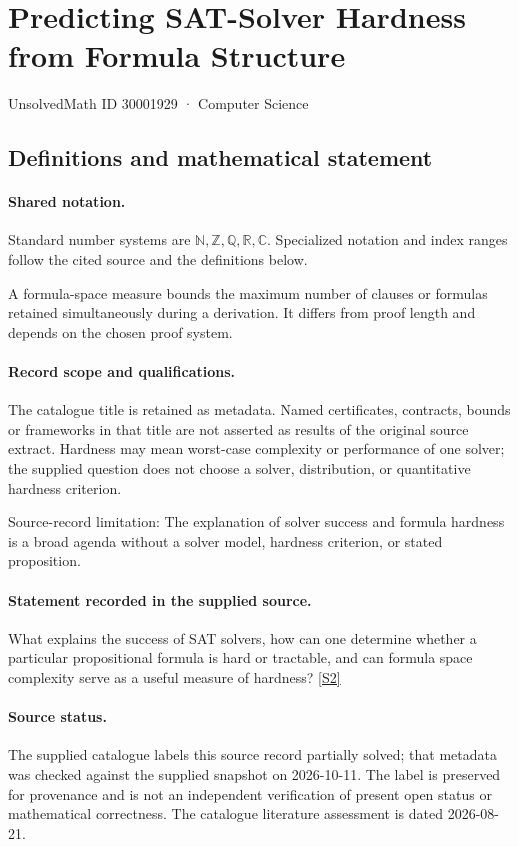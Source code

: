 \documentclass[11pt]{article}
\newcommand{\sref}[2]{\hyperlink{source:#1:#2}{[S#2]}}
\begin{document}
\setcounter{section}{30001928}
\section{Predicting SAT-Solver Hardness from Formula Structure}\label{30001929}
{\small\sffamily UnsolvedMath ID 30001929 · Computer Science}
\subsection{Definitions and mathematical statement}

\paragraph{Shared notation.}Standard number systems are $\mathbb N,\mathbb Z,\mathbb Q,\mathbb R,\mathbb C$. Specialized notation and index ranges follow the cited source and the definitions below.


A formula-space measure bounds the maximum number of clauses or formulas retained simultaneously during a derivation. It differs from proof length and depends on the chosen proof system.
\paragraph{Record scope and qualifications.}
The catalogue title is retained as metadata. Named certificates, contracts, bounds or frameworks in that title are not asserted as results of the original source extract.
Hardness may mean worst-case complexity or performance of one solver; the supplied question does not choose a solver, distribution, or quantitative hardness criterion.

Source-record limitation: The explanation of solver success and formula hardness is a broad agenda without a solver model, hardness criterion, or stated proposition.
\paragraph{Statement recorded in the supplied source.}
What explains the success of SAT solvers, how can one determine whether a particular propositional formula is hard or tractable, and can formula space complexity serve as a useful measure of hardness? \sref{30001929}{2}
\paragraph{Source status.}
The supplied catalogue labels this source record partially solved; that metadata was checked against the supplied snapshot on 2026-10-11. The label is preserved for provenance and is not an independent verification of present open status or mathematical correctness. The catalogue literature assessment is dated 2026-08-21.
\end{document}
